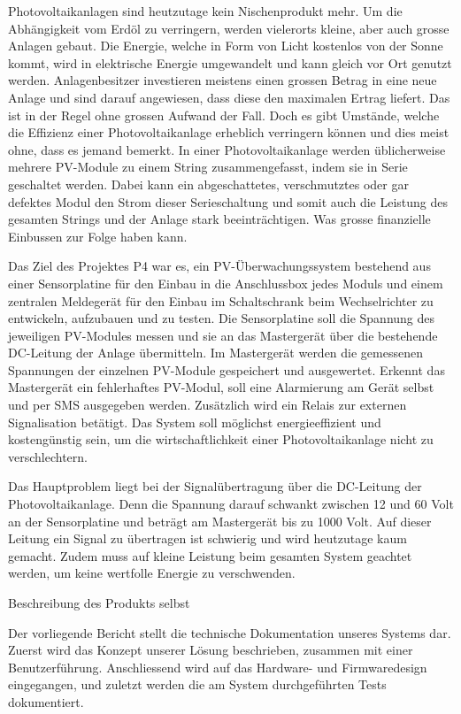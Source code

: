 Photovoltaikanlagen   sind  heutzutage   kein   Nischenprodukt  mehr. Um   die
Abhängigkeit  vom Erdöl  zu verringern,  werden vielerorts  kleine, aber  auch
grosse Anlagen  gebaut. Die Energie,  welche in Form  von Licht  kostenlos von
der  Sonne kommt,  wird in  elektrische  Energie umgewandelt  und kann  gleich
vor  Ort genutzt  werden. Anlagenbesitzer investieren  meistens einen  grossen
Betrag  in  eine neue  Anlage  und  sind  darauf  angewiesen, dass  diese  den
maximalen  Ertrag liefert. Das  ist  in  der Regel  ohne  grossen Aufwand  der
Fall. Doch  es gibt  Umstände, welche  die Effizienz  einer Photovoltaikanlage
erheblich verringern können  und dies meist ohne, dass es  jemand bemerkt.  In
einer  Photovoltaikanlage  werden  üblicherweise mehrere  PV-Module  zu  einem
String zusammengefasst, indem  sie in Serie geschaltet  werden. Dabei kann ein
abgeschattetes,  verschmutztes  oder  gar  defektes  Modul  den  Strom  dieser
Serieschaltung und somit auch die Leistung des gesamten Strings und der Anlage
stark beeinträchtigen. Was grosse finanzielle Einbussen zur Folge haben kann.

Das  Ziel des  Projektes P4  war es,  ein PV-Überwachungssystem  bestehend aus
einer Sensorplatine für den Einbau in  die Anschlussbox jedes Moduls und einem
zentralen Meldegerät  für den Einbau  im Schaltschrank beim  Wechselrichter zu
entwickeln, aufzubauen und zu testen. Die  Sensorplatine soll die Spannung des
jeweiligen PV-Modules  messen und sie  an das Mastergerät über  die bestehende
DC-Leitung  der  Anlage  übermitteln. Im  Mastergerät  werden  die  gemessenen
Spannungen der  einzelnen PV-Module  gespeichert und  ausgewertet. Erkennt das
Mastergerät ein fehlerhaftes  PV-Modul, soll eine Alarmierung  am Gerät selbst
und  per  SMS  ausgegeben  werden. Zusätzlich wird  ein  Relais  zur  externen
Signalisation  betätigt.   Das  System  soll  möglichst  energieeffizient  und
kostengünstig sein,  um die wirtschaftlichkeit einer  Photovoltaikanlage nicht
zu verschlechtern.

Das  Hauptproblem liegt  bei  der Signalübertragung  über  die DC-Leitung  der
Photovoltaikanlage. Denn die Spannung darauf schwankt  zwischen 12 und 60 Volt
an der Sensorplatine  und beträgt am Mastergerät bis zu  1000 Volt. Auf dieser
Leitung  ein Signal  zu  übertragen  ist schwierig  und  wird heutzutage  kaum
gemacht.  Zudem muss auf kleine Leistung beim gesamten System geachtet werden,
um keine wertfolle Energie zu verschwenden.

 Beschreibung des Produkts selbst

Der vorliegende  Bericht stellt  die technische Dokumentation  unseres Systems
dar.  Zuerst wird das Konzept unserer L\"osung beschrieben, zusammen mit einer
Benutzerf\"uhrung.  Anschliessend  wird auf  das Hardware-  und Firmwaredesign
eingegangen,  und   zuletzt  werden  die  am   System  durchgef\"uhrten  Tests
dokumentiert.
